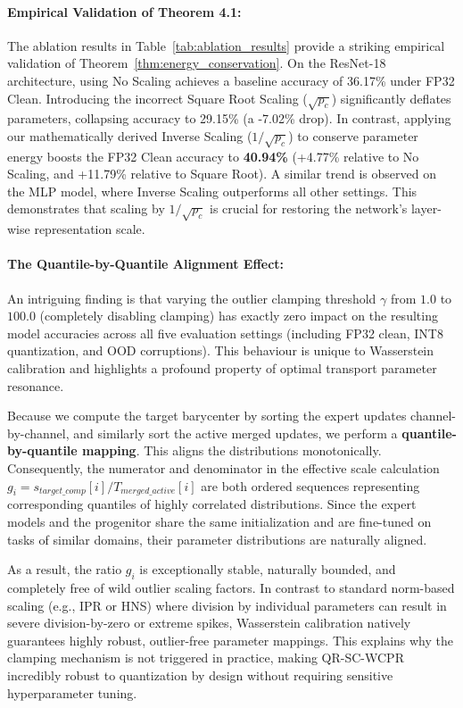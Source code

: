 \documentclass{article}
\theoremstyle{plain}
\theoremstyle{definition}
\theoremstyle{remark}
\begin{document}
\paragraph{Empirical Validation of Theorem 4.1:}
The ablation results in Table~\ref{tab:ablation_results} provide a striking empirical validation of Theorem~\ref{thm:energy_conservation}. On the ResNet-18 architecture, using No Scaling achieves a baseline accuracy of 36.17\% under FP32 Clean. Introducing the incorrect Square Root Scaling ($\sqrt{p_c}$) significantly deflates parameters, collapsing accuracy to 29.15\% (a -7.02\% drop). In contrast, applying our mathematically derived Inverse Scaling ($1/\sqrt{p_c}$) to conserve parameter energy boosts the FP32 Clean accuracy to \textbf{40.94\%} (+4.77\% relative to No Scaling, and +11.79\% relative to Square Root). A similar trend is observed on the MLP model, where Inverse Scaling outperforms all other settings. This demonstrates that scaling by $1/\sqrt{p_c}$ is crucial for restoring the network's layer-wise representation scale.

\paragraph{The Quantile-by-Quantile Alignment Effect:}
An intriguing finding is that varying the outlier clamping threshold $\gamma$ from $1.0$ to $100.0$ (completely disabling clamping) has exactly zero impact on the resulting model accuracies across all five evaluation settings (including FP32 clean, INT8 quantization, and OOD corruptions). This behaviour is unique to Wasserstein calibration and highlights a profound property of optimal transport parameter resonance.

Because we compute the target barycenter by sorting the expert updates channel-by-channel, and similarly sort the active merged updates, we perform a \textbf{quantile-by-quantile mapping}. This aligns the distributions monotonically. Consequently, the numerator and denominator in the effective scale calculation $g_i = s_{target\_comp}[i] / T_{merged\_active}[i]$ are both ordered sequences representing corresponding quantiles of highly correlated distributions. Since the expert models and the progenitor share the same initialization and are fine-tuned on tasks of similar domains, their parameter distributions are naturally aligned.

As a result, the ratio $g_i$ is exceptionally stable, naturally bounded, and completely free of wild outlier scaling factors. In contrast to standard norm-based scaling (e.g., IPR or HNS) where division by individual parameters can result in severe division-by-zero or extreme spikes, Wasserstein calibration natively guarantees highly robust, outlier-free parameter mappings. This explains why the clamping mechanism is not triggered in practice, making QR-SC-WCPR incredibly robust to quantization by design without requiring sensitive hyperparameter tuning.
\end{document}

